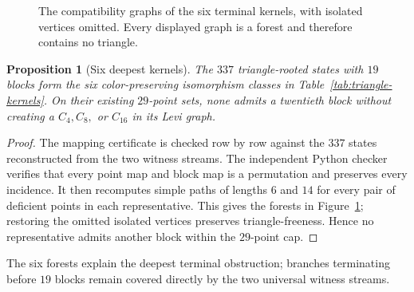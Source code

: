 \documentclass[11pt]{article}
\newtheorem{proposition}[theorem]{Proposition}
\theoremstyle{definition}
\begin{document}
\begin{figure}[htbp]
\caption{The compatibility graphs of the six terminal kernels, with isolated
vertices omitted. Every displayed graph is a forest and therefore contains
no triangle.}
\label{fig:compatibility-forests}
\end{figure}

\begin{proposition}[Six deepest kernels]\label{prop:triangle-kernels}
The \(337\) triangle-rooted states with \(19\) blocks form the six
color-preserving isomorphism classes in
Table~\ref{tab:triangle-kernels}. On their existing \(29\)-point sets, none
admits a twentieth block without creating a \(C_4,C_8,\) or \(C_{16}\) in
its Levi graph.
\end{proposition}

\begin{proof}
The mapping certificate is checked row by row against the \(337\)
states reconstructed from the two witness streams. The independent Python
checker verifies that every point map and block map is a permutation and
preserves every incidence. It then recomputes simple paths of lengths
\(6\) and \(14\) for every pair of deficient points in each representative.
This gives the forests in Figure~\ref{fig:compatibility-forests}; restoring
the omitted isolated vertices preserves triangle-freeness. Hence no
representative admits another block within the \(29\)-point cap.
\end{proof}

The six forests explain the deepest terminal obstruction; branches terminating
before \(19\) blocks remain covered directly by the two universal witness
streams.
\end{document}
